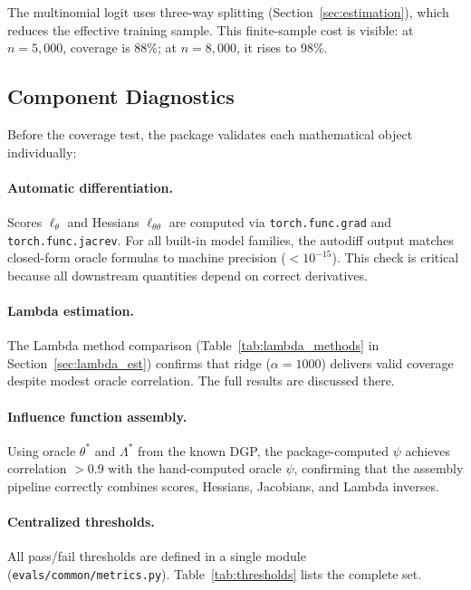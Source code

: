 The multinomial logit uses three-way splitting (Section~\ref{sec:estimation}), which reduces the effective training sample. This finite-sample cost is visible: at $n = 5{,}000$, coverage is 88\%; at $n = 8{,}000$, it rises to 98\%.

\subsection{Component Diagnostics}\label{sec:sim_diagnostics}

Before the coverage test, the package validates each mathematical object individually:

\paragraph{Automatic differentiation.} Scores $\ell_\theta$ and Hessians $\ell_{\theta\theta}$ are computed via \texttt{torch.func.grad} and \texttt{torch.func.jacrev}. For all built-in model families, the autodiff output matches closed-form oracle formulas to machine precision ($< 10^{-15}$). This check is critical because all downstream quantities depend on correct derivatives.

\paragraph{Lambda estimation.} The Lambda method comparison (Table~\ref{tab:lambda_methods} in Section~\ref{sec:lambda_est}) confirms that ridge ($\alpha = 1000$) delivers valid coverage despite modest oracle correlation. The full results are discussed there.

\paragraph{Influence function assembly.} Using oracle $\theta^*$ and $\Lambda^*$ from the known DGP, the package-computed $\psi$ achieves correlation $> 0.9$ with the hand-computed oracle $\psi$, confirming that the assembly pipeline correctly combines scores, Hessians, Jacobians, and Lambda inverses.

\paragraph{Centralized thresholds.} All pass/fail thresholds are defined in a single module (\texttt{evals/common/metrics.py}). Table~\ref{tab:thresholds} lists the complete set.

